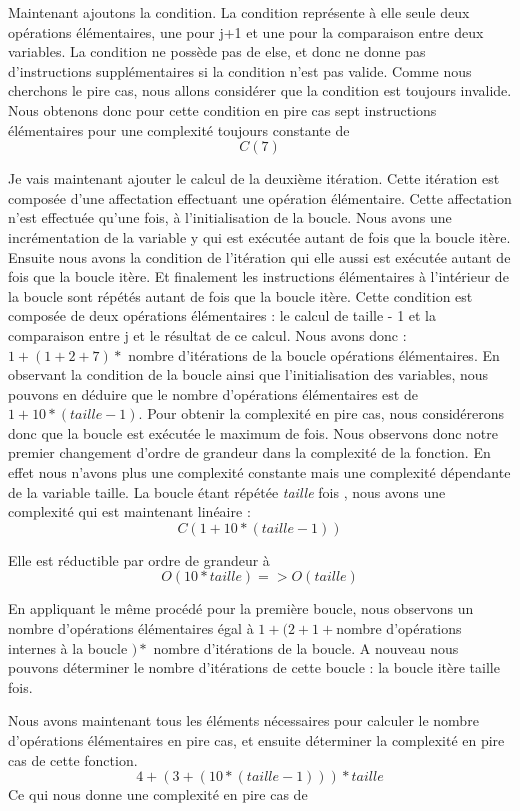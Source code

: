 \documentclass[12pt, twoside, openright]{report}
\begin{document}
Maintenant ajoutons la condition. La condition représente à elle seule deux opérations élémentaires, une pour j+1 et une pour la comparaison entre deux variables. La condition ne possède pas de else, et donc ne donne pas d'instructions supplémentaires si la condition n'est pas valide. Comme nous cherchons le pire cas, nous allons considérer que la condition est toujours invalide. Nous obtenons donc pour cette condition en pire cas sept instructions élémentaires pour une complexité toujours constante de \[C(7)\] 

Je vais maintenant ajouter le calcul de la deuxième itération. Cette itération est composée d'une affectation effectuant une opération élémentaire. Cette affectation n'est effectuée qu'une fois, à l'initialisation de la boucle. Nous avons une incrémentation de la variable y qui est exécutée autant de fois que la boucle itère. Ensuite nous avons la condition de l'itération qui elle aussi est exécutée autant de fois que la boucle itère. Et finalement les instructions élémentaires à l'intérieur de la boucle sont répétés autant de fois que la boucle itère. Cette condition est composée de deux opérations élémentaires : le calcul de taille - 1 et la comparaison entre j et le résultat de ce calcul. Nous avons donc  : $1 + (1 + 2 + 7) *$ nombre d'itérations de la boucle  opérations élémentaires. En observant la condition de la boucle ainsi que l'initialisation des variables, nous pouvons en déduire que le nombre d'opérations élémentaires est de $ 1 + 10 * (taille - 1)$. Pour obtenir la complexité en pire cas, nous considérerons donc que la boucle est exécutée le maximum de fois. Nous observons donc notre premier changement d'ordre de grandeur dans la complexité de la fonction. En effet nous n'avons plus une complexité constante mais une complexité dépendante de la variable taille. La boucle étant répétée \textit{taille} fois , nous avons une complexité qui est maintenant linéaire : \[C(1 + 10 * (taille-1))\] 

Elle est réductible par ordre de grandeur à \[O(10*taille) => O(taille)\]

En appliquant le même procédé pour la première boucle, nous observons un nombre d'opérations élémentaires égal à $1 + (2 + 1 + $nombre d'opérations internes à la boucle $) *$ nombre d'itérations de la boucle. A nouveau nous pouvons déterminer le nombre d'itérations de cette boucle : la boucle itère taille fois. 

Nous avons maintenant tous les éléments nécessaires pour calculer le nombre d'opérations élémentaires en pire cas, et ensuite déterminer la complexité en pire cas de cette fonction. 
$$ 4 + ( 3 + (10 * (taille - 1))) * taille$$
Ce qui nous donne une complexité en pire cas de 
\end{document}

